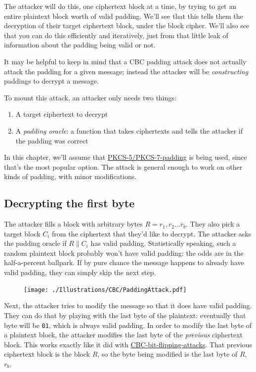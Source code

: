 \documentclass[11pt,ebook,table,dvipsnames]{memoir}
\begin{document}
The attacker will do this, one ciphertext block at a time, by trying
to get an entire plaintext block worth of valid padding. We'll see
that this tells them the decryption of their target ciphertext block,
under the block cipher. We'll also see that you can do this
efficiently and iteratively, just from that little leak of information
about the padding being valid or not.

It may be helpful to keep in mind that a CBC padding attack does not
actually attack the padding for a given message; instead the attacker
will be \emph{constructing} paddings to decrypt a message.

To mount this attack, an attacker only needs two things:

\begin{enumerate}
\item A target ciphertext to decrypt
\item A \emph{padding oracle}: a function that takes ciphertexts and tells
the attacker if the padding was correct
\end{enumerate}

In this chapter, we'll assume that \hyperref[PKCS\#5/PKCS\#7 padding]{PKCS-5/PKCS-7-padding} is being
used, since that's the most popular option. The attack is general
enough to work on other kinds of padding, with minor modifications.

\subsection{Decrypting the first byte}
\label{sec-2-3-9-1}

The attacker fills a block with arbitrary bytes $R = r_1, r_2\ldots
r_b$. They also pick a target block $C_i$ from the ciphertext that
they'd like to decrypt. The attacker asks the padding oracle if $R \|
C_i$ has valid padding. Statistically speaking, such a random
plaintext block probably won't have valid padding: the odds are in the
half-a-percent ballpark. If by pure chance the message happens to
already have valid padding, they can simply skip the next step.

\begin{figure}[ht!]
\centering
\texttt{[image: ./Illustrations/CBC/PaddingAttack.pdf]}
\end{figure}

Next, the attacker tries to modify the message so that it does have
valid padding. They can do that by playing with the last byte of the
plaintext: eventually that byte will be \verb~01~, which is always valid
padding. In order to modify the last byte of a plaintext block, the
attacker modifies the last byte of the \emph{previous} ciphertext block.
This works exactly like it did with \hyperref[CBC bit flipping attacks]{CBC-bit-flipping-attacks}. That
previous ciphertext block is the block $R$, so the byte being modified
is the last byte of $R$, $r_b$.
\end{document}
